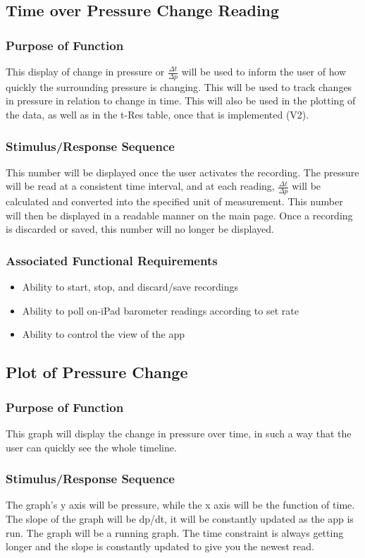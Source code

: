 \documentclass[onecolumn, draftclsnofoot,10pt, compsoc]{IEEEtran}
\begin{document}
\subsection{Time over Pressure Change Reading}
\subsubsection{Purpose of Function}
This display of change in pressure or $\frac{\Delta t}{\Delta p}$ will be used to inform the user of how quickly the surrounding pressure is changing.
This will be used to track changes in pressure in relation to change in time.
This will also be used in the plotting of the data, as well as in the t-Res table, once that is implemented (V2).
\subsubsection{Stimulus/Response Sequence}
This number will be displayed once the user activates the recording.
The pressure will be read at a consistent time interval, and at each reading, $\frac{\Delta t}{\Delta p}$ will be calculated and converted into the specified unit of measurement.
This number will then be displayed in a readable manner on the main page.
Once a recording is discarded or saved, this number will no longer be displayed.
\subsubsection{Associated Functional Requirements}
\begin{itemize}
\item Ability to start, stop, and discard/save recordings
\item Ability to poll on-iPad barometer readings according to set rate
\item Ability to control the view of the app
\end{itemize}

\subsection{Plot of Pressure Change}
\subsubsection{Purpose of Function}
This graph will display the change in pressure over time, in such a way that the user can quickly see the whole timeline.
\subsubsection{Stimulus/Response Sequence}
The graph's y axis will be pressure, while the x axis will be the function of time. The slope of the graph will be dp/dt, it will be constantly updated as the app is run.
The graph will be a running graph.
The time constraint is always getting longer and the slope is constantly updated to give you the newest read.
\end{document}
